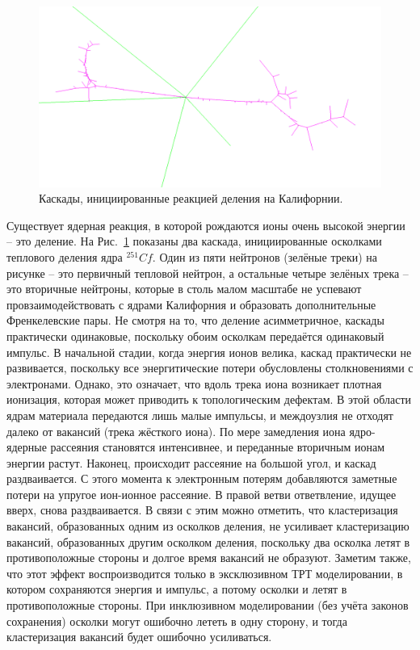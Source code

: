 \documentclass[a4paper,12pt]{article}
\begin{document}
\begin{large}
 \begin{figure}[ht]
  \centering
  \includegraphics[width=0.99\linewidth]{images/7_0_Cf_fission}
  \caption{Каскады, инициированные реакцией деления на Калифорнии.}
  \label{fig:CfFisIon}
 \end{figure}
 Существует ядерная реакция, в которой рождаются ионы очень высокой энергии -- это деление.
 На Рис.~\ref{fig:CfFisIon} показаны два каскада, инициированные осколками теплового деления ядра $^{251}Cf$.
 Один из пяти нейтронов (зелёные треки) на рисунке -- это первичный тепловой нейтрон, а остальные четыре зелёных трека -- это вторичные нейтроны, которые в столь малом масштабе не успевают провзаимодействовать с ядрами Калифорния и образовать дополнительные Френкелевские пары.
 Не смотря на то, что деление асимметричное, каскады практически одинаковые, поскольку обоим осколкам передаётся одинаковый импульс.
 В начальной стадии, когда энергия ионов велика, каскад практически не развивается, поскольку все энергитические потери обусловлены столкновениями с электронами.
 Однако, это означает, что вдоль трека иона возникает плотная ионизация, которая может приводить к топологическим дефектам.
 В этой области ядрам материала передаются лишь малые импульсы, и междоузлия не отходят далеко от вакансий (трека жёсткого иона).
 По мере замедления иона ядро-ядерные рассеяния становятся интенсивнее, и переданные вторичным ионам энергии растут.
 Наконец, происходит рассеяние на большой угол, и каскад раздваивается.
 С этого момента к электронным потерям добавляются заметные потери на упругое ион-ионное рассеяние.
 В правой ветви ответвление, идущее вверх, снова раздваивается.
 В связи с этим можно отметить, что кластеризация вакансий, образованных одним из осколков деления, не усиливает кластеризацию вакансий, образованных другим осколком деления, поскольку два осколка летят в противоположные стороны и долгое время вакансий не образуют.
 Заметим также, что этот эффект воспроизводится только в эксклюзивном ТРТ моделировании, в котором сохраняются энергия и импульс, а потому осколки и летят в противоположные стороны.
 При инклюзивном моделировании (без учёта законов сохранения) осколки могут ошибочно лететь в одну сторону, и тогда кластеризация вакансий будет ошибочно усиливаться.


\end{large}
\end{document}
